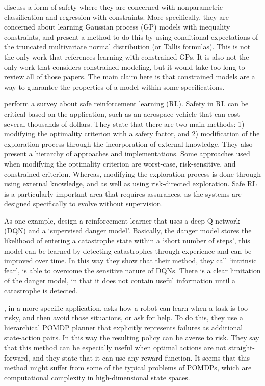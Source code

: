     \citet{Da_Veiga2012-gh} discuss a form of safety where they are concerned with nonparametric classification and regression with constraints. More specifically, they are concerned about learning Gaussian process (GP) models with inequality constraints, and present a method to do this by using conditional expectations of the truncated multivariate normal distribution (or Tallis formulas). This is not the only work that references learning with constrained GPs. It is also not the only work that considers constrained modeling, but it would take too long to review all of those papers. The main claim here is that constrained models are a way to guarantee the properties of a model within some specifications.

    \citet{Garcia2015-rs} perform a survey about safe reinforcement learning (RL). Safety in RL can be critical based on the application, such as an aerospace vehicle that can cost several thousands of dollars. They state that there are two main methods: 1) modifying the optimality criterion with a safety factor, and 2) modification of the exploration process through the incorporation of external knowledge. They also present a hierarchy of approaches and implementations. Some approaches used when modifying the optimality criterion are worst-case, risk-sensitive, and constrained criterion. Whereas, modifying the exploration process is done through using external knowledge, and as well as using risk-directed exploration. Safe RL is a particularly important area that requires assurances, as the systems are designed specifically to evolve without supervision.

    As one example, \citet{Lipton2016-dq} design a reinforcement learner that uses a deep Q-network (DQN) and a `supervised danger model'. Basically, the danger model stores the likelihood of entering a catastrophe state within a `short number of steps', this model can be learned by detecting catastrophes through experience and can be improved over time.  In this way they show that their method, they call `intrinsic fear', is able to overcome the sensitive nature of DQNs. There is a clear limitation of the danger model, in that it does not contain useful information until a catastrophe is detected. 

    \citet{Curran2016-ij}, in a more specific application, asks how a robot can learn when a task is too risky, and then avoid those situations, or ask for help. To do this, they use a hierarchical POMDP planner that explicitly represents failures as additional state-action pairs. In this way the resulting policy can be averse to risk. They say that this method can be especially useful when optimal actions are not straight-forward, and they state that it can use any reward function. It seems that this method might suffer from some of the typical problems of POMDPs, which are computational complexity in high-dimensional state spaces.

